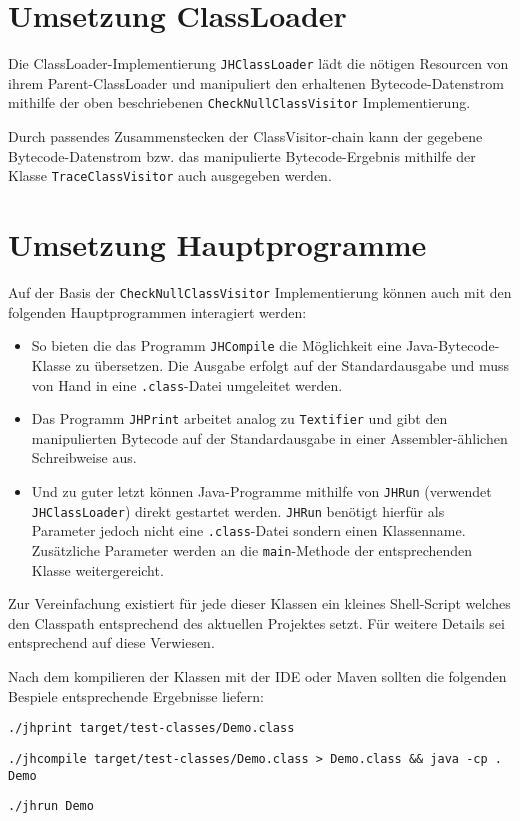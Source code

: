 \section{Umsetzung ClassLoader}

Die ClassLoader-Implementierung \texttt{JHClassLoader} lädt die nötigen Resourcen
von ihrem Parent-ClassLoader und manipuliert den erhaltenen Bytecode-Datenstrom
mithilfe der oben beschriebenen \texttt{CheckNullClassVisitor} Implementierung.

Durch passendes Zusammenstecken der ClassVisitor-chain kann der gegebene
Bytecode-Datenstrom bzw. das manipulierte Bytecode-Ergebnis mithilfe der
Klasse \texttt{TraceClassVisitor} auch ausgegeben werden.


\section{Umsetzung Hauptprogramme}

Auf der Basis der \texttt{CheckNullClassVisitor} Implementierung können
auch mit den folgenden Hauptprogrammen interagiert werden:

\begin{itemize}
\item So bieten die das Programm \texttt{JHCompile} die Möglichkeit eine Java-Bytecode-Klasse
zu übersetzen. Die Ausgabe erfolgt auf der Standardausgabe und muss von Hand in eine
\texttt{.class}-Datei umgeleitet werden.

\item Das Programm \texttt{JHPrint} arbeitet analog zu \texttt{Textifier} und gibt
den manipulierten Bytecode auf der Standardausgabe in einer Assembler-ählichen
Schreibweise aus.

\item Und zu guter letzt können Java-Programme mithilfe von \texttt{JHRun} (verwendet
\texttt{JHClassLoader}) direkt gestartet werden. \texttt{JHRun} benötigt hierfür
als Parameter jedoch nicht eine \texttt{.class}-Datei sondern einen Klassenname.
Zusätzliche Parameter werden an die \texttt{main}-Methode der entsprechenden Klasse weitergereicht.
\end{itemize}

Zur Vereinfachung existiert für jede dieser Klassen ein kleines Shell-Script
welches den Classpath entsprechend des aktuellen Projektes setzt.
Für weitere Details sei entsprechend auf diese Verwiesen.

Nach dem kompilieren der Klassen mit der IDE oder Maven sollten die folgenden
Bespiele entsprechende Ergebnisse liefern:

\vspace{0.3cm}

\texttt{./jhprint target/test-classes/Demo.class}

\vspace{0.3cm}

\texttt{./jhcompile target/test-classes/Demo.class > Demo.class \&\& java -cp . Demo}

\vspace{0.3cm}

\texttt{./jhrun Demo}


